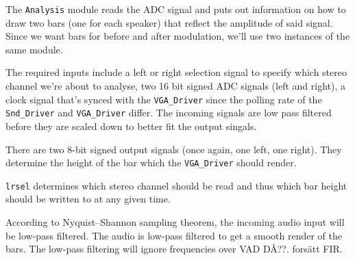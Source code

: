 The \verb=Analysis= module reads the ADC signal and puts out information on how to draw two bars (one for each speaker) that reflect the amplitude of said signal. Since we want bars for before and after modulation, we'll use two instances of the same module. 

The required inputs include a left or right selection signal to specify which stereo channel we're about to analyse, two 16 bit signed ADC signals (left and right), a clock signal that's synced with the \verb=VGA_Driver= since the polling rate of the \verb=Snd_Driver= and \verb=VGA_Driver= differ. The incoming signals are low pass filtered before they are scaled down to better fit the output singals.

There are two 8-bit signed output signals (once again, one left, one right). They determine the height of the bar which the \verb=VGA_Driver= should render.

\verb=lrsel= determines which stereo channel should be read and thus which bar height should be written to at any given time.


According to Nyquist–Shannon sampling theorem, the incoming audio input will be low-pass filtered. The audio is low-pass filtered to get a smooth render of the bars. 
The low-pass filtering will ignore frequencies over VAD DÅ??. forsätt FIR.
